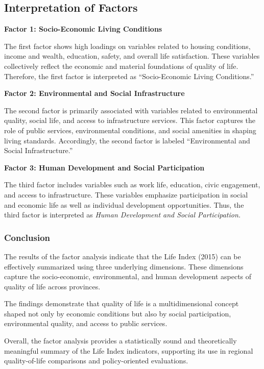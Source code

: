 \documentclass[
]{article}
\begin{document}
\subsection{Interpretation of Factors}\label{interpretation-of-factors}

\textbf{Factor 1: Socio-Economic Living Conditions}

The first factor shows high loadings on variables related to housing
conditions, income and wealth, education, safety, and overall life
satisfaction. These variables collectively reflect the economic and
material foundations of quality of life. Therefore, the first factor is
interpreted as ``Socio-Economic Living Conditions.''

\textbf{Factor 2: Environmental and Social Infrastructure}

The second factor is primarily associated with variables related to
environmental quality, social life, and access to infrastructure
services. This factor captures the role of public services,
environmental conditions, and social amenities in shaping living
standards. Accordingly, the second factor is labeled ``Environmental and
Social Infrastructure.''

\textbf{Factor 3: Human Development and Social Participation}

The third factor includes variables such as work life, education, civic
engagement, and access to infrastructure. These variables emphasize
participation in social and economic life as well as individual
development opportunities. Thus, the third factor is interpreted as
\emph{Human Development and Social Participation.}

\subsubsection{Conclusion}\label{conclusion}

The results of the factor analysis indicate that the Life Index (2015)
can be effectively summarized using three underlying dimensions. These
dimensions capture the socio-economic, environmental, and human
development aspects of quality of life across provinces.

The findings demonstrate that quality of life is a multidimensional
concept shaped not only by economic conditions but also by social
participation, environmental quality, and access to public services.

Overall, the factor analysis provides a statistically sound and
theoretically meaningful summary of the Life Index indicators,
supporting its use in regional quality-of-life comparisons and
policy-oriented evaluations.
\end{document}
